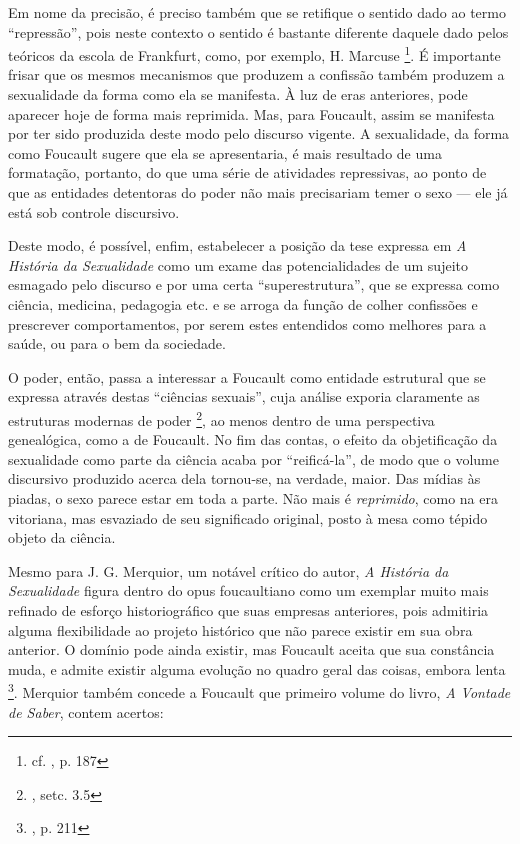 \documentclass[12pt,a4paper]{article}
\begin{document}
	Em nome da precisão, é preciso também que se retifique o sentido dado 
	ao termo ``repressão'', pois neste contexto o sentido é bastante diferente 
	daquele dado pelos teóricos da escola de Frankfurt, como, por exemplo, 
	H. Marcuse 
		\footnote{cf. \cite{merquior}, p. 187}. 
	É importante frisar que os mesmos mecanismos que produzem a confissão 
	também produzem a sexualidade da forma como ela se manifesta. À luz de 
	eras anteriores, pode aparecer hoje de forma mais reprimida. Mas, para 
	Foucault, assim se manifesta por ter sido produzida deste modo pelo 
	discurso vigente. A sexualidade, da forma como Foucault sugere que ela 
	se apresentaria, é mais resultado de uma formatação, portanto, do que 
	uma série de atividades repressivas, ao ponto de que as entidades 
	detentoras do poder não mais precisariam temer o sexo --- ele já está 
	sob controle discursivo. 
	
	Deste modo, é possível, enfim, estabelecer a posição da tese expressa 
	em \textit{A História da Sexualidade} como um exame das potencialidades 
	de um sujeito esmagado pelo discurso e por uma certa ``superestrutura'', 
	que se expressa como ciência, medicina, pedagogia etc. e se arroga da 
	função de colher confissões e prescrever comportamentos, por serem estes 
	entendidos como melhores para a saúde, ou para o bem da sociedade. 
	
	O poder, então, passa a interessar a Foucault como entidade estrutural 
	que se expressa através destas ``ciências sexuais'', cuja análise exporia 
	claramente as estruturas modernas de poder 	
	\footnote{\cite{sep}, setc. 3.5}, 
	ao menos dentro de uma perspectiva genealógica, como a de Foucault. 
	No fim das contas, o efeito da objetificação da sexualidade como parte da 
	ciência acaba por ``reificá-la'', de modo que o volume discursivo 
	produzido acerca dela tornou-se, na verdade, maior. Das mídias às piadas, 
	o sexo parece estar em toda a parte. Não mais é \textit{reprimido}, como 
	na era vitoriana, mas esvaziado de seu significado original, posto à 
	mesa como tépido objeto da ciência. 
	
	Mesmo para J. G. Merquior, um notável crítico do autor, 
	\textit{A História da Sexualidade} figura dentro 
	do opus foucaultiano como um exemplar muito mais refinado de esforço 
	historiográfico que suas empresas anteriores, pois admitiria alguma 
	flexibilidade ao projeto histórico que não parece existir em sua obra 
	anterior. O domínio pode ainda existir, mas Foucault aceita que sua 
	constância muda, e admite existir alguma evolução no quadro geral das 
	coisas, embora lenta
	\footnote{\cite{merquior}, p. 211}. 
	Merquior também concede a Foucault que primeiro volume do livro, 
	\textit{A Vontade de Saber}, contem acertos: 
	
\end{document}
